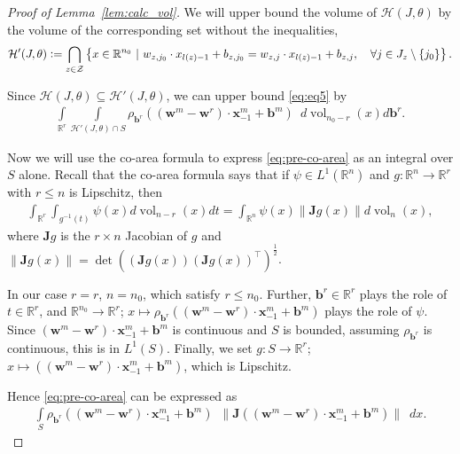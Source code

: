 \documentclass{article}
\theoremstyle{definition}
\newcommand{\defeq}{\vcentcolon=}
\newcommand{\nin}{n_0}
\newcommand{\vol}{\operatorname{vol}}
\begin{document}
\begin{proof}[Proof of Lemma~\ref{lem:calc_vol}]
    We will upper bound the volume of $\mathcal{H}(J,\theta)$ by the volume of the corresponding set without the inequalities, 
    \begin{align*}
        \mathcal{H}'(J,\theta)
        \defeq \bigcap\limits_{z \in \mathcal{Z}} \left\{ x \in \mathbb{R}^{\nin} \ | \ w_{z, j_0} \cdot x_{l(z)-1} + b_{z, j_0} = w_{z, j} \cdot x_{l(z)-1} + b_{z, j}, \quad \forall j \in J_z \setminus \{j_0\} \right \}.
    \end{align*}
    
    Since $\mathcal{H}(J,\theta) \subseteq \mathcal{H}'(J,\theta)$, we can upper bound \eqref{eq:eq5} by 
    \begin{align}
        \int\limits_{\mathbb{R}^r} \int\limits_{\mathcal{H}'(J,\theta) \cap S } \rho_{\mathbf{b}^r}((\mathbf{w}^m - \mathbf{w}^r) \cdot \mathbf{x}^m_{-1} + \mathbf{b}^m) \enspace d\vol_{\nin - r}(x) d\mathbf{b}^r. 
        \label{eq:pre-co-area}
    \end{align}
    
    Now we will use the co-area formula to express \eqref{eq:pre-co-area} as an integral over $S$ alone. 
    Recall that the co-area formula says that if $\psi \in L^1(\mathbb{R}^n)$ and $g: \mathbb{R}^n \rightarrow \mathbb{R}^r$ with $r \leq n$ is Lipschitz, then
    \begin{align*}
        \int_{\mathbb{R}^r}\int_{g^{-1}(t)} \psi(x) d \vol_{n-r}(x)dt = \int_{\mathbb{R}^n} \psi(x) \| \mathbf{J} g(x)\| d\vol_n(x), 
    \end{align*}
    where $\mathbf{J}g$ is the $r\times n$ Jacobian of $g$ and $\|\mathbf{J}g(x)\|=\det((\mathbf{J}g(x))(\mathbf{J}g(x))^\top)^\frac12$. 
    
In our case $r = r$, $n = \nin$, which satisfy $r \leq \nin$.
    Further, $\mathbf{b}^r \in \mathbb{R}^{r}$ plays the role of $t \in\mathbb{R}^r$, and $\mathbb{R}^{\nin}\to\mathbb{R}^r$; $x\mapsto \rho_{\mathbf{b}^r}((\mathbf{w}^m - \mathbf{w}^r) \cdot \mathbf{x}^m_{-1} + \mathbf{b}^m)$ plays the role of $\psi$.
    Since $(\mathbf{w}^m - \mathbf{w}^r) \cdot \mathbf{x}^m_{-1} + \mathbf{b}^m$ is continuous and $S$ is bounded, assuming $\rho_{\mathbf{b}^r}$ is continuous, this is in $L^1(S)$.
    Finally, we set $g\colon S \rightarrow \mathbb{R}^r$; $x\mapsto ((\mathbf{w}^m - \mathbf{w}^r) \cdot \mathbf{x}^m_{-1} + \mathbf{b}^m)$, which is Lipschitz.
    
    Hence \eqref{eq:pre-co-area} can be expressed as 
    \begin{align*}
        \int\limits_{S} \rho_{\mathbf{b}^r}((\mathbf{w}^m - \mathbf{w}^r) \cdot \mathbf{x}^m_{-1} + \mathbf{b}^m) \enspace \|\mathbf{J} ((\mathbf{w}^m - \mathbf{w}^r) \cdot \mathbf{x}^m_{-1} + \mathbf{b}^m)\| \enspace d x.
    \end{align*}
    

\end{proof}
\end{document}
